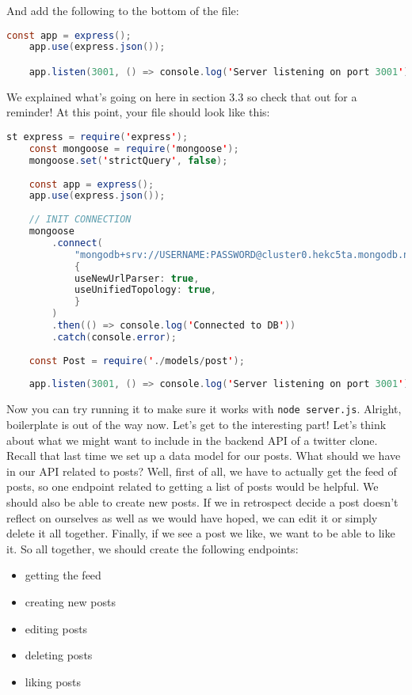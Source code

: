 And add the following to the bottom of the file:

\begin{lstlisting}[language=Java]
    const app = express();
    app.use(express.json());

    app.listen(3001, () => console.log('Server listening on port 3001'));
\end{lstlisting}

We explained what's going on here in section 3.3 so check that out for a reminder! At this point, your file should look like this:

\begin{lstlisting}[language=Java]
    st express = require('express');
    const mongoose = require('mongoose');
    mongoose.set('strictQuery', false);
    
    const app = express();
    app.use(express.json());
    
    // INIT CONNECTION
    mongoose
        .connect(
            "mongodb+srv://USERNAME:PASSWORD@cluster0.hekc5ta.mongodb.net/?retryWrites=true&w=majority",
            {
            useNewUrlParser: true,
            useUnifiedTopology: true,
            }
        )
        .then(() => console.log('Connected to DB'))
        .catch(console.error);
    
    const Post = require('./models/post');
    
    app.listen(3001, () => console.log('Server listening on port 3001'));
\end{lstlisting}

Now you can try running it to make sure it works with \texttt{node server.js}. Alright, boilerplate is out of the way now. Let's get to the interesting part! Let's think about what we might want to include in the backend API of a twitter clone. Recall that last time we set up a data model for our posts. What should we have in our API related to posts? Well, first of all, we have to actually get the feed of posts, so one endpoint related to getting a list of posts would be helpful. We should also be able to create new posts. If we in retrospect decide a post doesn't reflect on ourselves as well as we would have hoped, we can edit it or simply delete it all together. Finally, if we see a post we like, we want to be able to like it. So all together, we should create the following endpoints:

\begin{itemize}
    \item getting the feed
    \item creating new posts
    \item editing posts
    \item deleting posts
    \item liking posts
\end{itemize}

